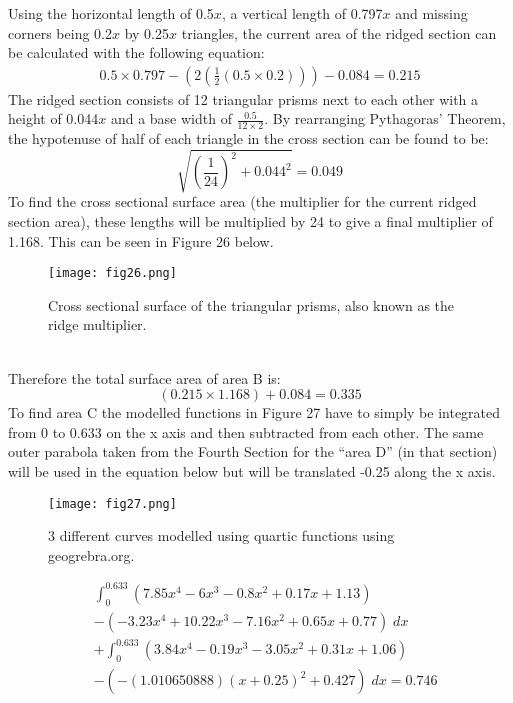 \documentclass[a4paper,12pt]{article}
\begin{document}
Using the horizontal length of 0.5$x$, a vertical length of 0.797$x$ and missing corners being 0.2$x$ by 0.25$x$ triangles, the current area of the ridged section can be calculated with the following equation: 
\begin{equation}
\begin{aligned} 
0.5\times0.797-(2(\frac{1}{2}(0.5\times0.2)))-0.084=0.215
\end{aligned}
\end{equation}
The ridged section consists of 12 triangular prisms next to each other with a height of 0.044$x$ and a base width of $\frac{0.5}{12\times2}$. By rearranging Pythagoras' Theorem, the hypotenuse of half of each triangle in the cross section can be found to be: $$\sqrt{(\frac{1}{24})^2+0.044^2}=0.049$$
To find the cross sectional surface area (the multiplier for the current ridged section area), these lengths will be multiplied by 24 to give a final multiplier of 1.168. This can be seen in Figure 26 below.
\begin{figure}[h!]
\centering
\texttt{[image: fig26.png]}
\caption{Cross sectional surface of the triangular prisms, also known as the ridge multiplier.}
\label{fig:clock26}
\end{figure}\\Therefore the total surface area of area B is: $$(0.215\times1.168)+0.084=0.335$$ 
To find area C the modelled functions in Figure 27 have to simply be integrated from 0 to 0.633 on the x axis and then subtracted from each other. The same outer parabola taken from the Fourth Section for the ``area D'' (in that section) will be used in the equation below but will be translated -0.25 along the x axis.
\begin{figure}[h!]
\centering
\texttt{[image: fig27.png]}
\caption{3 different curves modelled using quartic functions using geogrebra.org.}
\label{fig:clock27}
\end{figure}
\begin{equation}
\begin{aligned} 
&\int_{0}^{0.633}{(7.85x^4-6x^3-0.8x^2+0.17x+1.13)}\\&-(-3.23x^4+10.22x^3-7.16x^2+0.65x+0.77)\;dx \\&+\int_{0}^{0.633}{(3.84x^4-0.19x^3-3.05x^2+0.31x+1.06)}\\&-(-(1.010650888)(x+0.25)^2+0.427)\;dx=0.746
\end{aligned}
\end{equation}
\end{document}
